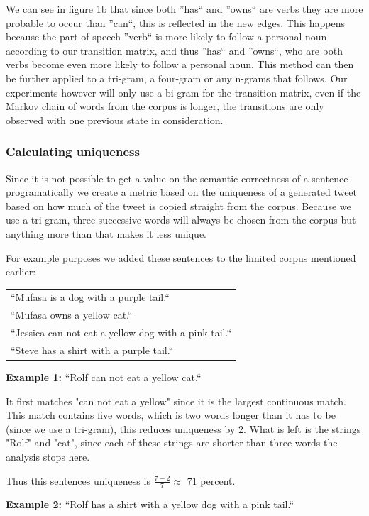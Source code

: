\documentclass[a4paper,12pt]{article}
\begin{document}
We can see in figure 1b that since both ''has`` and ''owns`` are verbs they are more probable to occur than ''can``, this is reflected in the new edges. 
This happens because the part-of-speech ''verb`` is more likely to follow a personal noun according to our transition matrix, and thus ''has`` and ''owns``, who are 
both verbs become even more likely to follow a personal noun. This method can then be further applied to a tri-gram, a four-gram or any n-grams that follows. 
Our experiments however will only use a bi-gram for the transition matrix, even if the Markov chain of words from the corpus is longer, 
the transitions are only observed with one previous state in consideration.

\subsubsection{Calculating uniqueness}
\label{subsec:calcuniq}
Since it is not possible to get a value on the semantic correctness of a sentence programatically we create a metric based on the uniqueness of a generated tweet based on how much of the tweet is copied straight from the corpus.
Because we use a tri-gram, three successive words will always be chosen from the corpus but anything more than that makes it less unique.

For example purposes we added these sentences to the limited corpus mentioned earlier:

\begin{tabular}{l}
``Mufasa is a dog with a purple tail.``\\
``Mufasa owns a yellow cat.``\\
``Jessica can not eat a yellow dog with a pink tail.``\\
``Steve has a shirt with a purple tail.``
\end{tabular}

\textbf{Example 1:} ``Rolf can not eat a yellow cat.``
	
It first matches "can not eat a yellow" since it is the largest continuous match. This match contains five words, which is two words longer than it has to be (since we use a tri-gram), this reduces uniqueness by 2. What is left is the strings "Rolf" and "cat", since each of these strings are shorter than three words the analysis stops here.

Thus this sentences uniqueness is $\frac{7 - 2}{7} \approx$ 71 percent.

\textbf{Example 2:} ``Rolf has a shirt with a yellow dog with a pink tail.``
	
\end{document}
